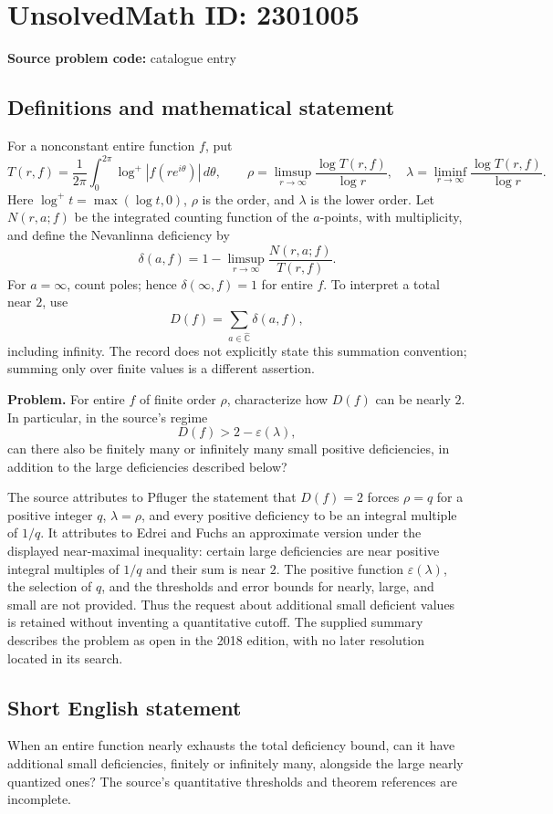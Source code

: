 \documentclass[11pt]{article}
\begin{document}
\section*{UnsolvedMath ID: 2301005}
\textbf{Source problem code:} catalogue entry
\subsection{Definitions and mathematical statement}
For a nonconstant entire function $f$, put
\[
T(r,f)=\frac1{2\pi}\int_0^{2\pi}\log^+|f(re^{i\theta})|\,d\theta,
\qquad
\rho=\limsup_{r\to\infty}\frac{\log T(r,f)}{\log r},\quad
\lambda=\liminf_{r\to\infty}\frac{\log T(r,f)}{\log r}.
\]
Here $\log^+t=\max(\log t,0)$, $\rho$ is the order, and $\lambda$ is the lower order. Let $N(r,a;f)$ be the integrated counting function of the $a$-points, with multiplicity, and define the Nevanlinna deficiency by
\[
\delta(a,f)=1-\limsup_{r\to\infty}\frac{N(r,a;f)}{T(r,f)}.
\]
For $a=\infty$, count poles; hence $\delta(\infty,f)=1$ for entire $f$. To interpret a total near $2$, use
\[
D(f)=\sum_{a\in\widehat{\mathbb C}}\delta(a,f),
\]
including infinity. The record does not explicitly state this summation convention; summing only over finite values is a different assertion.

\textbf{Problem.} For entire $f$ of finite order $\rho$, characterize how $D(f)$ can be nearly $2$. In particular, in the source's regime
\[
D(f)>2-\varepsilon(\lambda),
\]
can there also be finitely many or infinitely many small positive deficiencies, in addition to the large deficiencies described below?

The source attributes to Pfluger the statement that $D(f)=2$ forces $\rho=q$ for a positive integer $q$, $\lambda=\rho$, and every positive deficiency to be an integral multiple of $1/q$. It attributes to Edrei and Fuchs an approximate version under the displayed near-maximal inequality: certain large deficiencies are near positive integral multiples of $1/q$ and their sum is near $2$. The positive function $\varepsilon(\lambda)$, the selection of $q$, and the thresholds and error bounds for nearly, large, and small are not provided. Thus the request about additional small deficient values is retained without inventing a quantitative cutoff. The supplied summary describes the problem as open in the 2018 edition, with no later resolution located in its search.
\subsection{Short English statement}
When an entire function nearly exhausts the total deficiency bound, can it have additional small deficiencies, finitely or infinitely many, alongside the large nearly quantized ones? The source’s quantitative thresholds and theorem references are incomplete.
\end{document}
